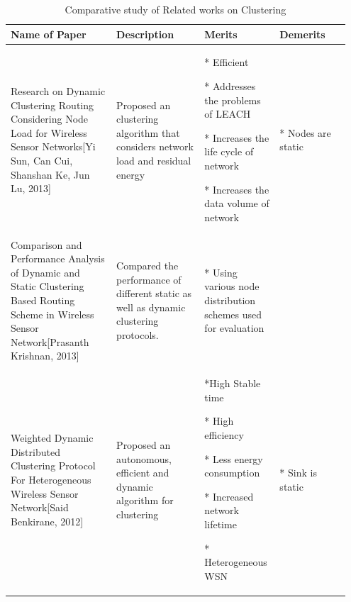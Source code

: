 \documentclass[MTech]{iitmdiss}
\begin{document}
\begin{table}[h]
\scriptsize\addtolength{\tabcolsep}{-4pt}
\centering
\caption{\label{table1} Comparative study of Related works on Clustering}
{
\hfill{}
\begin{tabular}{|p{0.3\linewidth}|p{0.25\linewidth}|p{0.20\linewidth}|p{0.20\linewidth}|}
  \hline
 \textbf{Name of Paper } & \textbf{Description} &\textbf{Merits} & \textbf{Demerits} \\ 
\hline  
\vspace{5mm}
Research on Dynamic Clustering Routing Considering 
Node Load for Wireless Sensor Networks[Yi Sun, Can Cui, Shanshan Ke, Jun Lu, 2013]
&\vspace{5mm} Proposed an clustering algorithm that considers network load and residual energy &
\vspace{0.7mm}
* Efficient
 
* Addresses the problems of LEACH 
  
* Increases the life cycle of network
 
 
* Increases the data volume of network

&\vspace{0.7mm}
* Nodes are static 
 \\
\hline
\vspace{5mm}
Comparison and Performance Analysis of Dynamic 
and Static Clustering Based Routing Scheme in 
Wireless Sensor Network[Prasanth Krishnan, 2013]
&\vspace{5mm} Compared the performance of different static as well as dynamic clustering protocols. &
\vspace{0.7mm}
* Using various node distribution schemes used for evaluation
&\\
\hline
\vspace{5mm}
Weighted Dynamic Distributed Clustering 
Protocol For Heterogeneous Wireless 
Sensor Network[Said Benkirane, 2012]
&\vspace{5mm} Proposed an autonomous, efficient and dynamic algorithm for clustering &\vspace{0.7mm}
*High Stable time

* High efficiency

* Less energy consumption

* Increased network lifetime

* Heterogeneous WSN
 
&\vspace{0.7mm}
* Sink is static 


\end{tabular}}
\end{table}
\end{document}
